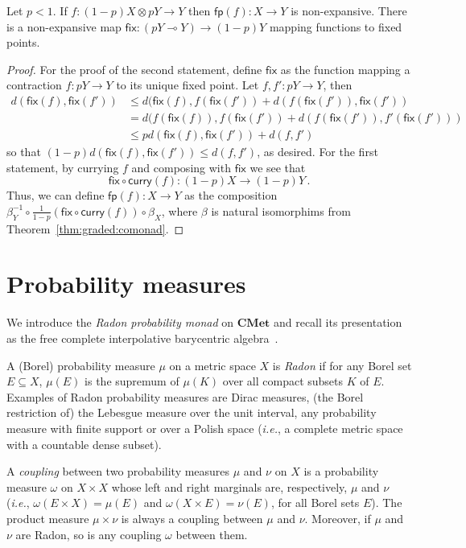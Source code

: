 \documentclass[a4paper,UKenglish,cleveref, autoref, thm-restate]{lipics-v2021}
\newcommand{\ie}{\textit{i.e.}}
\newcommand{\lol}{\mathbin{\multimap}}
\newcommand{\cat}[1]{\mathbf{#1}}
\newcommand{\CMet}{\cat{CMet}}
\newcommand{\mprod}{\otimes}
\newcommand{\mexp}{\lol}
\newcommand{\semfp}{\mathsf{fp}}
\newcommand{\semfix}{\mathsf{fix}}
\newcommand{\curry}{\mathsf{curry}}
\newcommand{\asmap}{\beta} %
\begin{document}
\begin{proposition} \label{prop:fp}
Let $p < 1$. If $f \colon (1-p)X \mprod pY \to Y$ then $\semfp (f) \colon X \to Y$ is non-expansive.  
There is a non-expansive map $\semfix \colon (pY \mexp Y) \to (1-p) Y$ mapping functions to fixed points.
\end{proposition}
\begin{proof}%
For the proof of the second statement, define $\semfix$ as the function mapping a contraction
$f \colon pY \to Y$ to its unique fixed point. Let $f,f' \colon pY \to Y$, then %
\begin{align*}
 d(\semfix (f), \semfix (f')) & \leq d(\semfix (f), f(\semfix (f')) + d(f(\semfix(f')), \semfix(f')) \\
 & =  d(f(\semfix (f)), f(\semfix (f')) + d(f(\semfix(f')), f'(\semfix(f'))) \\
 & \leq pd(\semfix(f), \semfix(f')) + d(f,f')  
\end{align*}
so that $(1-p)d(\semfix (f), \semfix (f')) \leq d(f,f')$, as desired. For the first statement, by currying $f$ and composing with $\semfix$ we see that
\[
  \semfix \circ \curry(f) \colon (1-p)X \to (1-p) Y \,.
\]
Thus, we can define $\semfp(f) \colon X \to Y$ as the composition $\asmap^{-1}_Y \circ \frac{1}{1-p}(\semfix \circ \curry(f)) \circ \asmap_X$, where $\asmap$ is natural isomorphims from Theorem~\ref{thm:graded:comonad}.
\end{proof}


\section{Probability measures}
\label{sec:prob:meas}


We introduce the \emph{Radon probability monad} on $\CMet$ and recall its presentation as the free complete interpolative barycentric algebra~\cite{MardarePP18}.


A (Borel) probability measure $\mu$ on a metric space $X$ is \emph{Radon} if for any Borel set $E \subseteq X$, $\mu(E)$ is the supremum of $\mu(K)$ over all compact subsets $K$ of $E$. Examples of Radon probability measures are Dirac measures, (the Borel restriction of) the Lebesgue measure over the unit interval, any probability measure with finite support or over a Polish space (\ie, a complete metric space with a countable dense subset).

A \emph{coupling} between
two probability measures $\mu$ and $\nu$ on $X$ is a probability measure $\omega$ on $X \times X$
whose left and right marginals are,
respectively, $\mu$ and $\nu$ (\ie, 
$\omega(E \times X) = \mu(E)$ and $\omega(X \times E) = \nu(E)$, for all Borel sets $E$). The product measure $\mu \times \nu$ is always a coupling between $\mu$ and $\nu$. Moreover, if $\mu$ and $\nu$ are Radon, so is any coupling $\omega$ between them.
\end{document}
